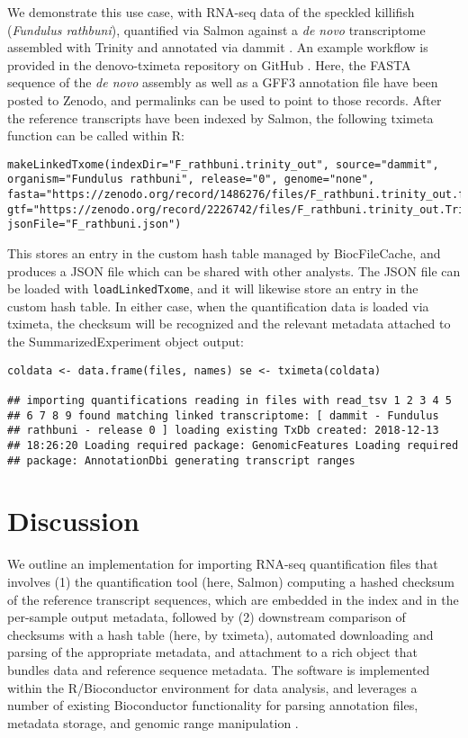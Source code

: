 \documentclass[12pt]{article} \usepackage[utf8]{inputenc}
\begin{document}
We demonstrate this use case, with RNA-seq data of the speckled
killifish (\textit{Fundulus rathbuni}), quantified via Salmon
\citep{salmon} against a \textit{de novo} transcriptome assembled with
Trinity \citep{trinity} and annotated via dammit \citep{dammit}. An
example workflow is provided in the denovo-tximeta repository on
GitHub \citep{denovo}. Here, the FASTA sequence of the \textit{de
  novo} assembly as well as a GFF3 annotation file have been posted to
Zenodo, and permalinks can be used to point to those records. After
the reference transcripts have been indexed by Salmon, the following
tximeta function can be called within R:

\begin{verbatim}
makeLinkedTxome(indexDir="F_rathbuni.trinity_out", source="dammit",
organism="Fundulus rathbuni", release="0", genome="none",
fasta="https://zenodo.org/record/1486276/files/F_rathbuni.trinity_out.fasta",
gtf="https://zenodo.org/record/2226742/files/F_rathbuni.trinity_out.Trinity.fasta.dammit.gff3",
jsonFile="F_rathbuni.json")
\end{verbatim}

This stores an entry in the custom hash table managed by
BiocFileCache, and produces a JSON file which can be shared with other
analysts. The JSON file can be loaded with \texttt{loadLinkedTxome},
and it will likewise store an entry in the custom hash table. In
either case, when the quantification data is loaded via tximeta, the
checksum will be recognized and the relevant metadata attached to the
SummarizedExperiment object output:

\begin{verbatim}
coldata <- data.frame(files, names) se <- tximeta(coldata)

## importing quantifications reading in files with read_tsv 1 2 3 4 5
## 6 7 8 9 found matching linked transcriptome: [ dammit - Fundulus
## rathbuni - release 0 ] loading existing TxDb created: 2018-12-13
## 18:26:20 Loading required package: GenomicFeatures Loading required
## package: AnnotationDbi generating transcript ranges
\end{verbatim}

\section*{Discussion}

We outline an implementation for importing RNA-seq quantification
files that involves (1) the quantification tool (here, Salmon)
computing a hashed checksum of the reference transcript sequences,
which are embedded in the index and in the per-sample output metadata,
followed by (2) downstream comparison of checksums with a hash table
(here, by tximeta), automated downloading and parsing of the
appropriate metadata, and attachment to a rich object that bundles
data and reference sequence metadata. The software is implemented
within the R/Bioconductor environment for data analysis, and leverages
a number of existing Bioconductor functionality for parsing annotation
files, metadata storage, and genomic range manipulation
\citep{bioc,ensembldb,biocfilecache,granges}.
\end{document}
